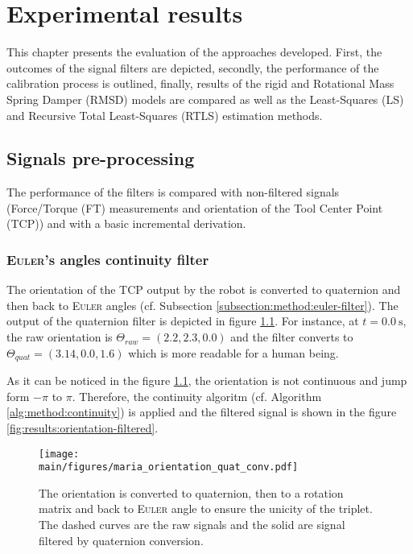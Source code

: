 \documentclass[/home/francois/latex/report/main.tex]{subfiles}
\begin{document}
\chapter{Experimental results}
\label{chapter:results}

This chapter presents the evaluation of the approaches developed. First, the outcomes of the signal filters are depicted, secondly, the performance of the calibration process is outlined, finally, results of the rigid and Rotational Mass Spring Damper (RMSD) models are compared as well as the Least-Squares (LS) and Recursive Total Least-Squares (RTLS) estimation methods.

\section{Signals pre-processing}
\label{section:results:pre-processing}

The performance of the filters is compared with non-filtered signals (Force/Torque (FT) measurements and orientation of the Tool Center Point (TCP)) and with a basic incremental derivation.

\subsection{\textsc{Euler}'s angles continuity filter}

The orientation of the \ac{TCP} output by the robot is converted to quaternion and then back to \textsc{Euler} angles (cf. Subsection \ref{subsection:method:euler-filter}). The output of the quaternion filter is depicted in figure \ref{fig:results:quat-conv}. For instance, at $t = 0.0 \ \si{\second}$, the raw orientation is $\Theta_{raw} = (2.2, 2.3, 0.0)$ and the filter converts to  $\Theta_{quat} = (3.14, 0.0, 1.6)$ which is more readable for a human being.

As it can be noticed in the figure \ref{fig:results:quat-conv}, the orientation is not continuous and jump form $-\pi$ to $\pi$. Therefore, the continuity algoritm (cf. Algorithm \ref{alg:method:continuity}) is applied and the filtered signal is shown in the figure \ref{fig:results:orientation-filtered}.

\begin{figure}
  \centering
  \texttt{[image: \\main/figures/maria\_orientation\_quat\_conv.pdf]}
    \caption{The orientation is converted to quaternion, then to a rotation matrix and back to \textsc{Euler} angle to ensure the unicity of the triplet. The dashed curves are the raw signals and the solid are signal filtered by quaternion conversion.}
  \label{fig:results:quat-conv}
\end{figure}
\end{document}
